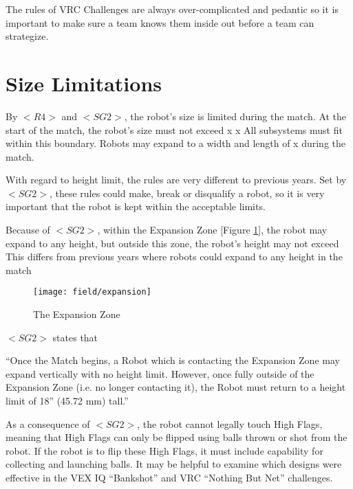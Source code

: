 \documentclass[../../main.tex]{subfiles}
\begin{document}
The rules of VRC Challenges are always over-complicated and pedantic
so it is important to make sure a team knows them inside out before a team can
strategize.

\section{Size Limitations}

By $<R4>$ and $<SG2>$, the robot’s size is limited during the match. 
At the start of the match, the robot’s size must not exceed  x  x  
All subsystems must fit within this boundary.
Robots may expand to a width and length of  x  during the match. \par

With regard to height limit, the rules are very different to previous years.
Set by $<SG2>$, these rules could make, break or disqualify a robot,
so it is very important that the robot is kept within the acceptable limits. \par

Because of $<SG2>$, within the Expansion Zone [Figure \ref{fig:expansionzone}], the robot may expand to any height,
but outside this zone, the robot’s height may not exceed  
This differs from previous years where robots could expand to any height in the match 
\par

\begin{figure}
    \centering
    \texttt{[image: field/expansion]}
    \caption{The Expansion Zone}
    \label{fig:expansionzone}
\end{figure}

$<SG2>$ states that

``Once the Match begins, a Robot which is contacting the Expansion Zone 
may expand vertically with no height limit. However, once fully outside of the 
Expansion Zone 
(i.e. no longer contacting it), the Robot
must return to a height limit of 18” (45.72 mm) tall.''
\par

As a consequence of $<SG2>$,
the robot cannot legally touch High Flags, meaning that High Flags can only be
flipped using balls thrown or shot from the robot. If the robot is to flip these
High Flags, it must include capability for collecting and launching balls.
It may be helpful to examine which designs were effective in the VEX IQ
“Bankshot” and VRC “Nothing But Net” challenges.
\end{document}
